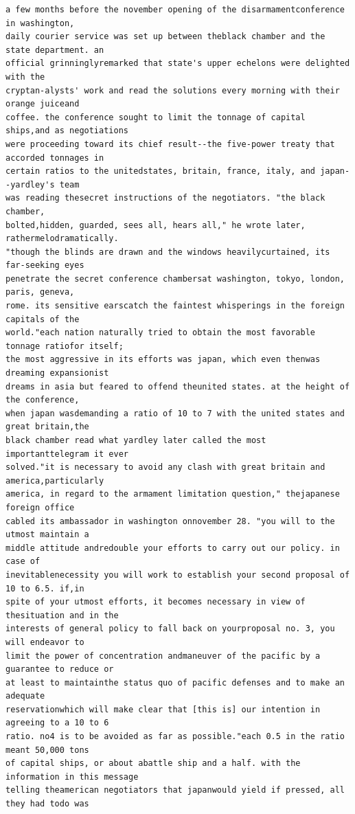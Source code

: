 \documentclass[11pt,a4paper]{article}
\begin{document}
\begin{lstlisting}[style=ciphertext,caption={Complete text after iteration 12}]
a few months before the november opening of the disarmamentconference in washington,
daily courier service was set up between theblack chamber and the state department. an
official grinninglyremarked that state's upper echelons were delighted with the
cryptan-alysts' work and read the solutions every morning with their orange juiceand
coffee. the conference sought to limit the tonnage of capital ships,and as negotiations
were proceeding toward its chief result--the five-power treaty that accorded tonnages in
certain ratios to the unitedstates, britain, france, italy, and japan--yardley's team
was reading thesecret instructions of the negotiators. "the black chamber,
bolted,hidden, guarded, sees all, hears all," he wrote later, rathermelodramatically.
"though the blinds are drawn and the windows heavilycurtained, its far-seeking eyes
penetrate the secret conference chambersat washington, tokyo, london, paris, geneva,
rome. its sensitive earscatch the faintest whisperings in the foreign capitals of the
world."each nation naturally tried to obtain the most favorable tonnage ratiofor itself;
the most aggressive in its efforts was japan, which even thenwas dreaming expansionist
dreams in asia but feared to offend theunited states. at the height of the conference,
when japan wasdemanding a ratio of 10 to 7 with the united states and great britain,the
black chamber read what yardley later called the most importanttelegram it ever
solved."it is necessary to avoid any clash with great britain and america,particularly
america, in regard to the armament limitation question," thejapanese foreign office
cabled its ambassador in washington onnovember 28. "you will to the utmost maintain a
middle attitude andredouble your efforts to carry out our policy. in case of
inevitablenecessity you will work to establish your second proposal of 10 to 6.5. if,in
spite of your utmost efforts, it becomes necessary in view of thesituation and in the
interests of general policy to fall back on yourproposal no. 3, you will endeavor to
limit the power of concentration andmaneuver of the pacific by a guarantee to reduce or
at least to maintainthe status quo of pacific defenses and to make an adequate
reservationwhich will make clear that [this is] our intention in agreeing to a 10 to 6
ratio. no4 is to be avoided as far as possible."each 0.5 in the ratio meant 50,000 tons
of capital ships, or about abattle ship and a half. with the information in this message
telling theamerican negotiators that japanwould yield if pressed, all they had todo was

\end{lstlisting}
\end{document}
